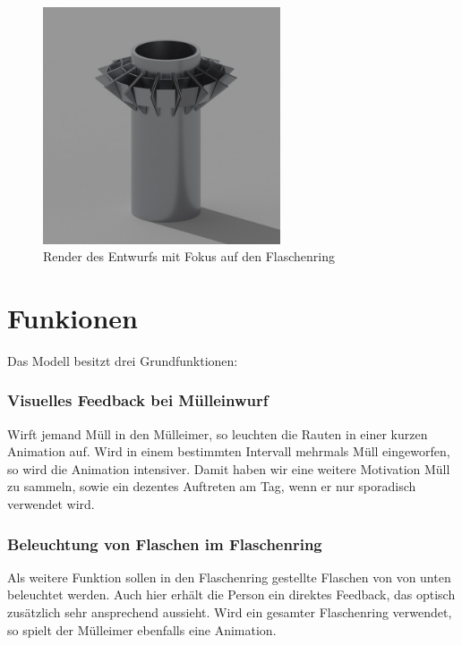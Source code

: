     \begin{figure}[H]
        \begin{center}
            \includegraphics[width=7cm]{media/01_project/render_bin.jpg}
        \end{center}
        \caption{Render des Entwurfs mit Fokus auf den Flaschenring}
        \label{fig:pencil_bin_3}
    \end{figure}

\section{Funkionen}\label{cpt:funktionen}

    Das Modell besitzt drei Grundfunktionen:

    \subsubsection{Visuelles Feedback bei Mülleinwurf}
        
        Wirft jemand Müll in den Mülleimer, so leuchten die Rauten in einer kurzen Animation auf.
        Wird in einem bestimmten Intervall mehrmals Müll eingeworfen, so wird die Animation intensiver. Damit haben wir eine weitere Motivation Müll zu sammeln, sowie ein dezentes Auftreten am Tag, wenn er nur sporadisch verwendet wird.
      

    \subsubsection{Beleuchtung von Flaschen im Flaschenring}

        Als weitere Funktion sollen in den Flaschenring gestellte Flaschen von von unten beleuchtet werden. Auch hier erhält die Person ein direktes Feedback, das optisch zusätzlich sehr ansprechend aussieht.
        Wird ein gesamter Flaschenring verwendet, so spielt der Mülleimer ebenfalls eine Animation.


